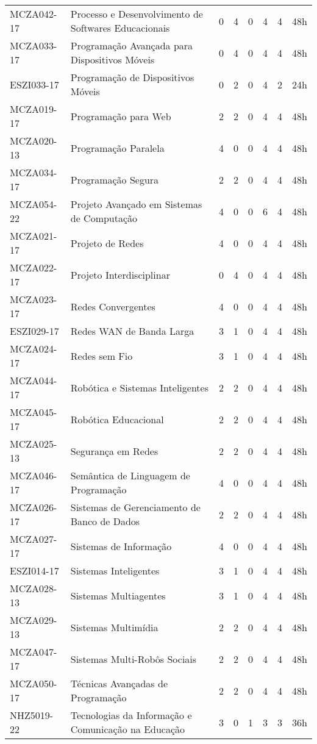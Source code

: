 \documentclass[a4paper]{article}
\begin{document}
\begin{longtable}{|l|l|llll|l|l|}
MCZA042-17 & Processo e Desenvolvimento de Softwares Educacionais & 0 & 4 & 0 & 4 & 4 & 48h \\
MCZA033-17 & Programação Avançada para Dispositivos Móveis & 0 & 4 & 0 & 4 & 4 & 48h \\
ESZI033-17 & Programação de Dispositivos Móveis & 0 & 2 & 0 & 4 & 2 & 24h \\
MCZA019-17 & Programação para Web & 2 & 2 & 0 & 4 & 4 & 48h \\
MCZA020-13 & Programação Paralela & 4 & 0 & 0 & 4 & 4 & 48h \\
MCZA034-17 & Programação Segura & 2 & 2 & 0 & 4 & 4 & 48h \\
MCZA054-22 & Projeto Avançado em Sistemas de Computação & 4 & 0 & 0 & 6 & 4 & 48h \\
MCZA021-17 & Projeto de Redes & 4 & 0 & 0 & 4 & 4 & 48h \\
MCZA022-17 & Projeto Interdisciplinar & 0 & 4 & 0 & 4 & 4 & 48h \\
MCZA023-17 & Redes Convergentes & 4 & 0 & 0 & 4 & 4 & 48h \\
ESZI029-17 & Redes WAN de Banda Larga & 3 & 1 & 0 & 4 & 4 & 48h \\
MCZA024-17 & Redes sem Fio & 3 & 1 & 0 & 4 & 4 & 48h \\
MCZA044-17 & Robótica e Sistemas Inteligentes & 2 & 2 & 0 & 4 & 4 & 48h \\
MCZA045-17 & Robótica Educacional & 2 & 2 & 0 & 4 & 4 & 48h \\
MCZA025-13 & Segurança em Redes & 2 & 2 & 0 & 4 & 4 & 48h \\
MCZA046-17 & Semântica de Linguagem de Programação & 4 & 0 & 0 & 4 & 4 & 48h \\
MCZA026-17 & Sistemas de Gerenciamento de Banco de Dados & 2 & 2 & 0 & 4 & 4 & 48h \\
MCZA027-17 & Sistemas de Informação & 4 & 0 & 0 & 4 & 4 & 48h \\
ESZI014-17 & Sistemas Inteligentes & 3 & 1 & 0 & 4 & 4 & 48h \\
MCZA028-13 & Sistemas Multiagentes & 3 & 1 & 0 & 4 & 4 & 48h \\
MCZA029-13 & Sistemas Multimídia & 2 & 2 & 0 & 4 & 4 & 48h \\
MCZA047-17 & Sistemas Multi-Robôs Sociais & 2 & 2 & 0 & 4 & 4 & 48h \\
MCZA050-17 & Técnicas Avançadas de Programação & 2 & 2 & 0 & 4 & 4 & 48h \\ 
NHZ5019-22 & Tecnologias da Informação e Comunicação na Educação & 3 & 0 & 1 & 3 & 3 & 36h \\ 

\end{longtable}
\end{document}
